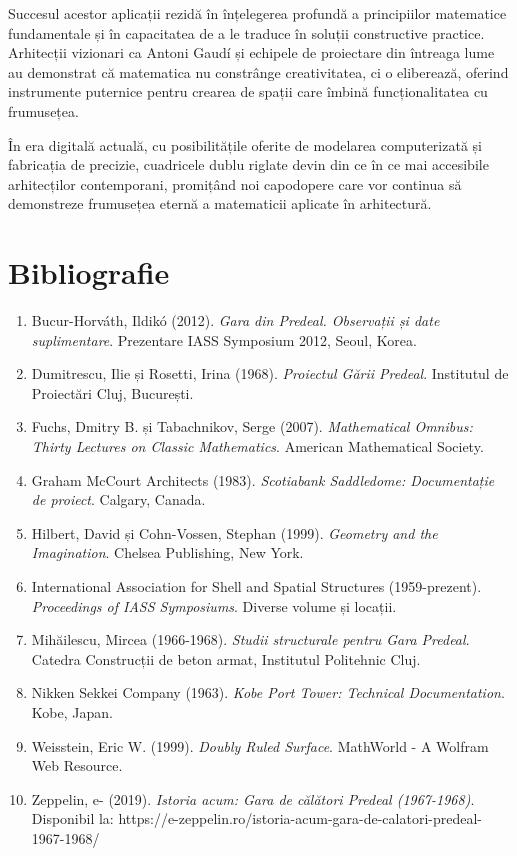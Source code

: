 \documentclass[12pt,a4paper]{article}
\begin{document}
Succesul acestor aplicații rezidă în înțelegerea profundă a principiilor matematice fundamentale și în capacitatea de a le traduce în soluții constructive practice. Arhitecții vizionari ca Antoni Gaudí și echipele de proiectare din întreaga lume au demonstrat că matematica nu constrânge creativitatea, ci o eliberează, oferind instrumente puternice pentru crearea de spații care îmbină funcționalitatea cu frumusețea.

În era digitală actuală, cu posibilitățile oferite de modelarea computerizată și fabricația de precizie, cuadricele dublu riglate devin din ce în ce mai accesibile arhitecților contemporani, promițând noi capodopere care vor continua să demonstreze frumusețea eternă a matematicii aplicate în arhitectură.

\section*{Bibliografie}

\begin{enumerate}[label=\arabic*.]
    \item Bucur-Horváth, Ildikó (2012). \textit{Gara din Predeal. Observații și date suplimentare}. Prezentare IASS Symposium 2012, Seoul, Korea.
    \item Dumitrescu, Ilie și Rosetti, Irina (1968). \textit{Proiectul Gării Predeal}. Institutul de Proiectări Cluj, București.
    \item Fuchs, Dmitry B. și Tabachnikov, Serge (2007). \textit{Mathematical Omnibus: Thirty Lectures on Classic Mathematics}. American Mathematical Society.
    \item Graham McCourt Architects (1983). \textit{Scotiabank Saddledome: Documentație de proiect}. Calgary, Canada.
    \item Hilbert, David și Cohn-Vossen, Stephan (1999). \textit{Geometry and the Imagination}. Chelsea Publishing, New York.
    \item International Association for Shell and Spatial Structures (1959-prezent). \textit{Proceedings of IASS Symposiums}. Diverse volume și locații.
    \item Mihăilescu, Mircea (1966-1968). \textit{Studii structurale pentru Gara Predeal}. Catedra Construcții de beton armat, Institutul Politehnic Cluj.
    \item Nikken Sekkei Company (1963). \textit{Kobe Port Tower: Technical Documentation}. Kobe, Japan.
    \item Weisstein, Eric W. (1999). \textit{Doubly Ruled Surface}. MathWorld - A Wolfram Web Resource.
    \item Zeppelin, e- (2019). \textit{Istoria acum: Gara de călători Predeal (1967-1968)}. Disponibil la: https://e-zeppelin.ro/istoria-acum-gara-de-calatori-predeal-1967-1968/
\end{enumerate}
\end{document}
